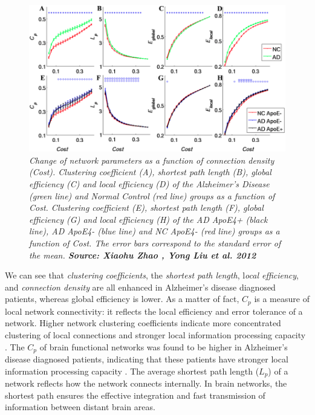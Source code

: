 \documentclass[12pt,openright,twoside,a4paper]{book}
\begin{document}
\begin{figure}[!h]
\centering
\includegraphics[scale=0.45]{ssa}
\caption{\textit{Change of network parameters as a function of connection density (Cost). Clustering coefficient (A), shortest path length (B), global efficiency (C) and local efficiency (D) of the Alzheimer's Disease (green line) and Normal Control (red line) groups as a function of Cost. Clustering coefficient (E), shortest path length (F), global efficiency (G) and local efficiency (H) of the AD ApoE4+ (black line), AD ApoE4- (blue line) and NC ApoE4- (red line) groups as a function of Cost. The error bars correspond to the standard error of the mean. \textbf{Source: Xiaohu Zhao , Yong Liu et al. 2012 \cite{ssa}}}}
\label{ssa}
\end{figure}

\vspace{5mm}

We can see that \textit{clustering coefficients}, the \textit{shortest path length}, l\textit{ocal efficiency}, and \textit{connection density} are all enhanced in Alzheimer's disease diagnosed patients, whereas global efficiency is lower. 
As a matter of fact, $C_p$ is a measure of local network connectivity: it reflects the local efficiency and error tolerance of a network. 
Higher network clustering coefficients indicate more concentrated clustering of local connections and stronger local information processing capacity \cite{Rest-NTW}.
The $C_p$ of brain functional networks was found to be higher in Alzheimer's disease diagnosed patients, indicating that these patients have stronger local information processing capacity \cite{ssa}.
The average shortest path length ($L_p$) of a network reflects how the network connects internally. In brain networks, the shortest path ensures the effective integration and fast transmission of information between distant brain areas.
\end{document}
